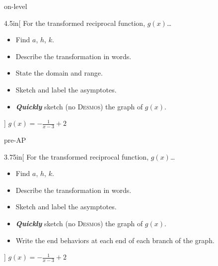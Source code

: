 \begin{taggedblock}{on-level}
    \begin{myWideProblem}{4.5in}[%
        For the transformed reciprocal function, $g(x)$\dots
        \vspace{-1em}
        \begin{itemize}[nosep]
            \item Find $a$, $h$, $k$.
            \item Describe the transformation in words.
            \item State the domain and range.
            \item Sketch and label the asymptotes.
            \item {\bfseries\itshape Quickly} sketch (no {\scshape Desmos}) the graph of $g(x)$.
        \end{itemize}
        ]
        {
            $g(x) = -\frac{1}{x-3} + 2$
        }
    \end{myWideProblem}
\end{taggedblock}

\begin{taggedblock}{pre-AP}
    \begin{myWideProblem}{3.75in}[%
        For the transformed reciprocal function, $g(x)$\dots
        \vspace{-1em}
        \begin{itemize}[nosep]
            \item Find $a$, $h$, $k$.
            \item Describe the transformation in words.
            \item Sketch and label the asymptotes.
            \item {\bfseries\itshape Quickly} sketch (no {\scshape Desmos}) the graph of $g(x)$.
            \item Write the end behaviors at each end of each branch of the graph.
        \end{itemize}
        ]
        {
            $g(x) = - \frac{1}{x-3} + 2$
        }
    \end{myWideProblem}
\end{taggedblock}